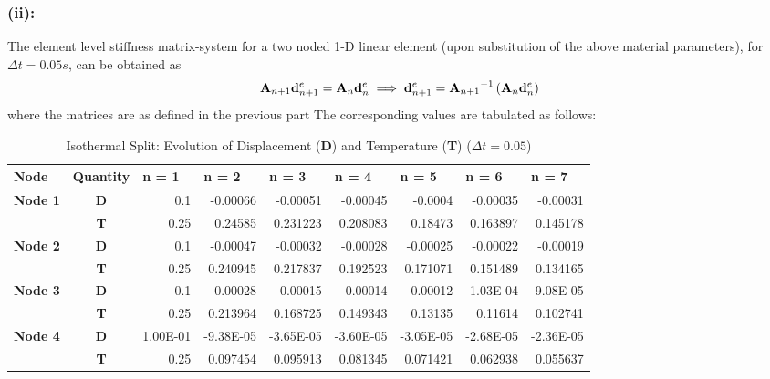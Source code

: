 \subsubsection*{(ii):}
The element level stiffness matrix-system for a two noded 1-D linear element (upon substitution of the above material parameters), for $\Delta t = 0.05s$, can be obtained as 
\begin{align*}
{\bf A}_{n+1}
{\bf d}^e_{n+1}
=
{\bf A}_{n}
{\bf d}^e_{n} \implies {\bf d}^e_{n+1} = {{\bf A}_{n+1}}^{-1}
\left( 
{\bf A}_{n}
{\bf d}^e_{n}
\right)
\end{align*}
where the matrices are as defined in the previous part
The corresponding values are tabulated as follows: \\
\begin{table}[htbp]
  \centering
  \caption{Isothermal Split: Evolution of Displacement ({\bf D}) and Temperature ({\bf T}) ($\Delta t = 0.05$)}
    \begin{tabular}{rcrrrrrrr}
    \toprule
    \multicolumn{1}{l}{\textbf{Node}} & \multicolumn{1}{l}{\textbf{Quantity}} & \multicolumn{1}{l}{\textbf{n = 1}} & \multicolumn{1}{l}{\textbf{n = 2}} & \multicolumn{1}{l}{\textbf{n = 3}} & \multicolumn{1}{l}{\textbf{n = 4}} & \multicolumn{1}{l}{\textbf{n = 5}} & \multicolumn{1}{l}{\textbf{n = 6}} & \multicolumn{1}{l}{\textbf{n = 7}} \\
    \midrule
    \multicolumn{1}{l}{\textbf{Node 1}} & \textbf{D} & 0.1   & -0.00066 & -0.00051 & -0.00045 & -0.0004 & -0.00035 & -0.00031 \\
          & \textbf{T} & 0.25  & 0.24585 & 0.231223 & 0.208083 & 0.18473 & 0.163897 & 0.145178 \\
    \multicolumn{1}{l}{\textbf{Node 2}} & \textbf{D} & 0.1   & -0.00047 & -0.00032 & -0.00028 & -0.00025 & -0.00022 & -0.00019 \\
          & \textbf{T} & 0.25  & 0.240945 & 0.217837 & 0.192523 & 0.171071 & 0.151489 & 0.134165 \\
    \multicolumn{1}{l}{\textbf{Node 3}} & \textbf{D} & 0.1   & -0.00028 & -0.00015 & -0.00014 & -0.00012 & -1.03E-04 & -9.08E-05 \\
          & \textbf{T} & 0.25  & 0.213964 & 0.168725 & 0.149343 & 0.13135 & 0.11614 & 0.102741 \\
    \multicolumn{1}{l}{\textbf{Node 4}} & \textbf{D} & 1.00E-01 & -9.38E-05 & -3.65E-05 & -3.60E-05 & -3.05E-05 & -2.68E-05 & -2.36E-05 \\
          & \textbf{T} & 0.25  & 0.097454 & 0.095913 & 0.081345 & 0.071421 & 0.062938 & 0.055637 \\

\end{tabular}
\end{table}
